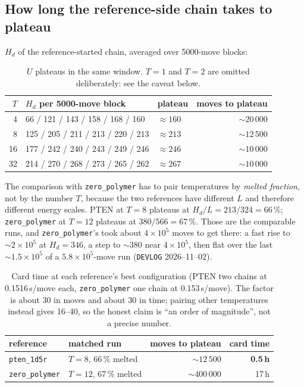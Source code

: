 \documentclass[11pt,a4paper]{article}
\newcommand{\Hd}{H_d}
\newcommand{\file}[1]{\texttt{#1}}
\begin{document}
\subsection{How long the reference-side chain takes to plateau}

$\Hd$ of the reference-started chain, averaged over 5000-move blocks:

\begin{table}[h]
\centering
\begin{tabular}{rllr}
\toprule
$T$ & $\Hd$ per 5000-move block & plateau & moves to plateau \\
\midrule
4   & 66 / 121 / 143 / 158 / 168 / 160 & $\approx 160$ & ${\sim}20\,000$ \\
8   & 125 / 205 / 211 / 213 / 220 / 213 & $\approx 213$ & ${\sim}12\,500$ \\
16  & 177 / 242 / 240 / 243 / 249 / 246 & $\approx 246$ & ${\sim}10\,000$ \\
32  & 214 / 270 / 268 / 273 / 265 / 262 & $\approx 267$ & ${\sim}10\,000$ \\
\bottomrule
\end{tabular}
\caption{$U$ plateaus in the same window. $T=1$ and $T=2$ are omitted
deliberately: see the caveat below.}
\end{table}

\noindent
The comparison with \file{zero\_polymer} has to pair temperatures by
\emph{melted fraction}, not by the number $T$, because the two references have
different $L$ and therefore different energy scales. PTEN at $T=8$ plateaus at
$\Hd/L = 213/324 = 66\,\%$; \file{zero\_polymer} at $T=12$ plateaus at
$380/566 = 67\,\%$. Those are the comparable runs, and
\file{zero\_polymer}'s took about $4\times10^5$ moves to get there: a fast rise
to ${\sim}2\times10^5$ at $\Hd=346$, a step to ${\sim}380$ near
$4\times10^5$, then flat over the last ${\sim}1.5\times10^5$ of a
$5.8\times10^5$-move run (\file{DEVLOG} 2026--11--02).

\begin{table}[h]
\centering
\begin{tabular}{llrr}
\toprule
reference & matched run & moves to plateau & card time \\
\midrule
\file{pten\_1d5r}    & $T=8$, 66\,\% melted  & ${\sim}12\,500$ & \textbf{0.5\,h} \\
\file{zero\_polymer} & $T=12$, 67\,\% melted & ${\sim}400\,000$ & 17\,h \\
\bottomrule
\end{tabular}
\caption{Card time at each reference's best configuration (PTEN two chains at
0.1516\,s/move each, \file{zero\_polymer} one chain at 0.153\,s/move). The
factor is about 30 in moves and about 30 in time; pairing other temperatures
instead gives 16--40, so the honest claim is ``an order of magnitude'', not a
precise number.}
\end{table}
\end{document}
